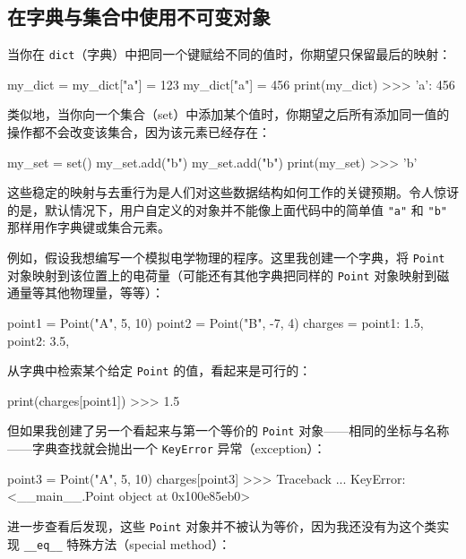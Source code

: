 \subsection{在字典与集合中使用不可变对象}

当你在 \texttt{dict}（字典）中把同一个键赋给不同的值时，你期望只保留最后的映射：

\begin{codebox}[python]
my_dict = {}
my_dict["a"] = 123
my_dict["a"] = 456
print(my_dict)
>>>
{'a': 456}
\end{codebox}

类似地，当你向一个集合（set）中添加某个值时，你期望之后所有添加同一值的操作都不会改变该集合，因为该元素已经存在：

\begin{codebox}[python]
my_set = set()
my_set.add("b")
my_set.add("b")
print(my_set)
>>>
{'b'}
\end{codebox}

这些稳定的映射与去重行为是人们对这些数据结构如何工作的关键预期。令人惊讶的是，默认情况下，用户自定义的对象并不能像上面代码中的简单值 \texttt{"a"} 和 \texttt{"b"} 那样用作字典键或集合元素。

例如，假设我想编写一个模拟电学物理的程序。这里我创建一个字典，将 \texttt{Point} 对象映射到该位置上的电荷量（可能还有其他字典把同样的 \texttt{Point} 对象映射到磁通量等其他物理量，等等）：

\begin{codebox}[python]
point1 = Point("A", 5, 10)
point2 = Point("B", -7, 4)
charges = {
    point1: 1.5,
    point2: 3.5,
}
\end{codebox}

从字典中检索某个给定 \texttt{Point} 的值，看起来是可行的：

\begin{codebox}[python]
print(charges[point1])
>>>
1.5
\end{codebox}

但如果我创建了另一个看起来与第一个等价的 \texttt{Point} 对象——相同的坐标与名称——字典查找就会抛出一个 \texttt{KeyError} 异常（exception）：

\begin{codebox}[python]
point3 = Point("A", 5, 10)
charges[point3]
>>>
Traceback ...
KeyError: <__main__.Point object at 0x100e85eb0>
\end{codebox}

进一步查看后发现，这些 \texttt{Point} 对象并不被认为等价，因为我还没有为这个类实现 \texttt{\_\_eq\_\_} 特殊方法（special method）：

